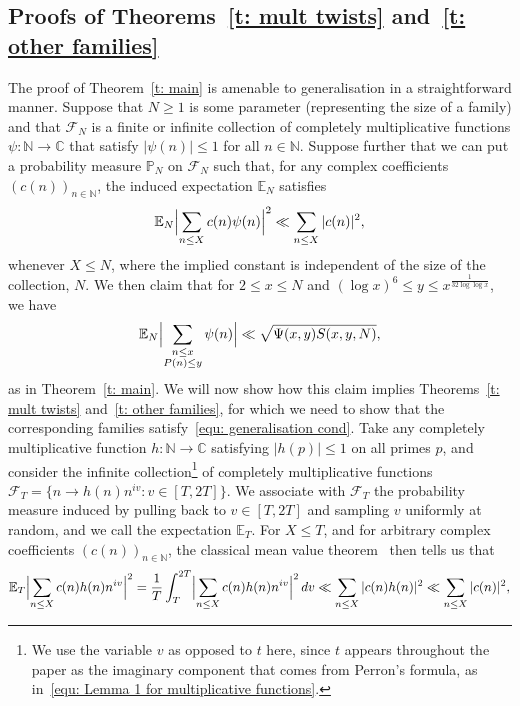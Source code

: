\documentclass[a4paper,12pt,reqno]{amsart}
\newcommand{\N}{\mathbb{N}}
\newcommand{\E}{\mathbb{E}}
\newcommand{\p}{\mathbb{P}}
\newcommand{\C}{\mathbb{C}}
\begin{document}
\subsection{Proofs of Theorems~\ref{t: mult twists} and~\ref{t: other families}}
The proof of Theorem~\ref{t: main} is amenable to generalisation in a straightforward manner. Suppose that $N \geq 1$ is some parameter (representing the size of a family) and that $\mathcal{F}_N$ is a finite or infinite collection of completely multiplicative functions $\psi \colon \N \rightarrow \C$ that satisfy $|\psi(n)| \leq 1$ for all $n \in \N$. Suppose further that we can put a probability measure $\p_N$ on $\mathcal{F}_N$ such that, for any complex coefficients $(c(n))_{n \in \N}$, the induced expectation $\E_N$ satisfies
\begin{equation}\label{equ: generalisation cond}
\E_{N} \Bigl| \sum_{n \leq X} c(n) \psi(n) \Bigr|^2 \ll \sum_{n \leq X} |c(n)|^2 ,
\end{equation}
whenever $X \leq N$, where the implied constant is independent of the size of the collection, $N$. We then claim that for $2 \leq x \leq N$ and $(\log x)^6 \leq y \leq x^{\frac{1}{32 \log \log x}}$, we have
\begin{equation}\label{eqn: claim}
\E_{N} \Bigl| \sum_{\substack{n \leq x \\ P(n) \leq y}} \psi (n) \Bigr| \ll \sqrt{\Psi(x,y)S(x,y,N)}, 
\end{equation}
as in Theorem~\ref{t: main}. We will now show how this claim implies Theorems~\ref{t: mult twists} and~\ref{t: other families}, for which we need to show that the corresponding families satisfy~\eqref{equ: generalisation cond}. Take any completely multiplicative function $h \colon \N \rightarrow \C$ satisfying $|h(p)| \leq 1$ on all primes $p$, and consider the infinite collection\footnote{We use the variable $v$ as opposed to $t$ here, since $t$ appears throughout the paper as the imaginary component that comes from Perron's formula, as in~\eqref{equ: Lemma 1 for multiplicative functions}.} of completely multiplicative functions $\mathcal{F}_{T} = \{ n \rightarrow h(n) n^{iv}: v \in [T,2T]\}$. We associate with $\mathcal{F}_T$ the probability measure induced by pulling back to $v \in [T,2T]$ and sampling $v$ uniformly at random, and we call the expectation $\E_T$. For $X \leq T$, and for arbitrary complex coefficients $(c(n))_{n \in \N}$, the classical mean value theorem~\cite[Theorem~9.1]{IK} then tells us that
\[
\E_T \Bigl| \sum_{n \leq X} c(n) h(n) n^{iv} \Bigr|^2 =  \frac{1}{T} \int_{T}^{2T} \Bigl| \sum_{n \leq X} c(n) h(n) n^{iv} \Bigr|^2 \, dv \ll \sum_{n \leq X} |c(n) h(n)|^2 \ll \sum_{n \leq X} |c(n)|^2 ,
\]
\end{document}
